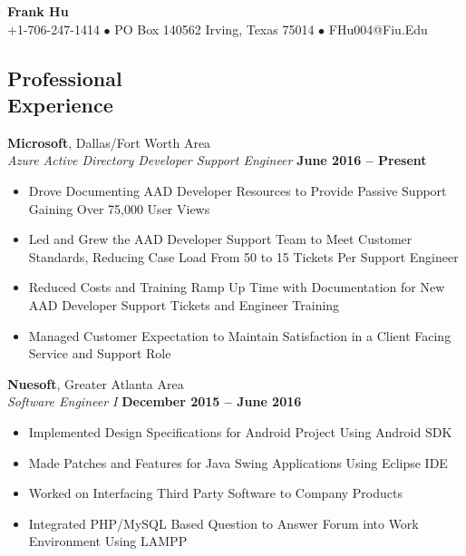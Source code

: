 \documentclass[margin,line]{resume}
\begin{document}
	{\centering \LARGE{\textbf{Frank Hu}}}
	\\
	\normalsize
	+1-706-247-1414 $\bullet$ PO Box 140562 Irving, Texas 75014 $\bullet$ FHu004@Fiu.Edu
	
	\begin{resume}
	
		
	\section{\mysidestyle Professional\\Experience}
	
	\textbf{Microsoft}, Dallas/Fort Worth Area \vspace{1mm}\\\vspace{1mm}
	\textsl{Azure Active Directory Developer Support Engineer} \hfill \textbf{June 2016 -- Present}
	\begin{itemize}
		 \item Drove Documenting AAD Developer Resources to Provide Passive Support Gaining Over 75,000 User Views	
		 \item Led and Grew the AAD Developer Support Team to Meet Customer Standards, Reducing Case Load From 50 to 15 Tickets Per Support Engineer 
		 \item Reduced Costs and Training Ramp Up Time with Documentation for New AAD Developer Support Tickets and Engineer Training 
		\item Managed Customer Expectation to Maintain Satisfaction in a Client
		Facing Service and Support Role
	
	\end{itemize}

	\textbf{Nuesoft}, Greater Atlanta Area \vspace{1mm}\\\vspace{1mm}%
	\textsl{Software Engineer I} \hfill \textbf{December 2015 -- June 2016}
	\begin{itemize}
	 	\item Implemented Design Specifications for Android Project Using Android SDK
	 	\item Made Patches and Features for Java Swing Applications Using Eclipse IDE 
	 	\item Worked on Interfacing Third Party Software to Company Products
	 	\item Integrated PHP/MySQL Based Question to Answer Forum into Work Environment Using LAMPP
	\end{itemize}
	

\end{resume}
\end{document}
